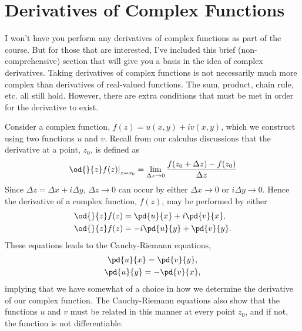 \documentclass[final,a4paper,12pt]{article}
\theoremstyle{definition}
\begin{document}
\section{Derivatives of Complex Functions}
I won't have you perform any derivatives of complex functions as part of the
course.  But for those that are interested, I've included this brief
(non-comprehensive) section that will give you a basis in the idea of complex
derivatives.  Taking derivatives of complex functions is not necessarily much
more complex than derivatives of real-valued functions.  The sum, product, chain
rule, etc. all still hold.  However, there are extra conditions that must be met
in order for the derivative to exist.

Consider a complex function, $f(z) = u(x,y) + i v(x,y)$, which we construct
using two functions $u$ and $v$.  Recall from our calculus discussions that the
derivative at a point, $z_0$, is defined as
\begin{equation*}
    \left. \od{}{z} f(z) \right|_{z = z_0} =
        \lim_{\Delta z \to 0} \frac{f(z_0 + \Delta z) - f(z_0)}{\Delta z}
\end{equation*}
Since $\Delta z = \Delta x + i \Delta y$, $\Delta z \to 0$ can occur by either
$\Delta x \to 0$ or $i \Delta y \to 0$.  Hence the derivative of a complex
function, $f(z)$, may be performed by either
\begin{align}
    \od{}{z} f(z) &= \pd{u}{x} + i \pd{v}{x} ,\label{eq:dzdx}\\
    \od{}{z} f(z) &= -i\pd{u}{y} + \pd{v}{y} .\\
    \label{eq:dzdy}
\end{align}
These equations leads to the Cauchy-Riemann equations,
\begin{gather}
    \pd{u}{x} = \pd{v}{y} ,\\
    \pd{u}{y} = -\pd{v}{x} ,
\end{gather}
implying that we have somewhat of a choice in how we determine the derivative of
our complex function.  The Cauchy-Riemann equations also show that the functions
$u$ and $v$ must be related in this manner at every point $z_0$, and if not, the
function is not differentiable.
\end{document}
